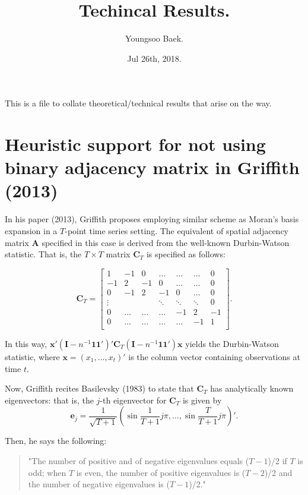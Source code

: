 \documentclass[12pt]{article}
\begin{document}
 
\title{Techincal Results.}
\author{Youngsoo Baek.}
\date{Jul 26th, 2018.}
\maketitle

This is a file to collate theoretical/technical results that arise on the way.

\section*{Heuristic support for not using binary adjacency matrix in Griffith (2013)}
In his paper (2013), Griffith proposes employing similar scheme as Moran's basis expansion in a $T$-point time series setting. The equivalent of spatial adjacency matrix $\mathbf{A}$ specified in this case is derived from the well-known Durbin-Watson statistic. That is, the $T\times T$ matrix $\mathbf{C}_T$ is specified as follows:

$$
\mathbf{C}_T = \left[
\begin{array}{ccccccc}
1 & -1 & 0 & \dots & \dots & \dots & 0\\
-1 & 2 & -1 & 0 & \dots & \dots & 0\\
0 & -1 & 2 & -1 & 0 & \dots & 0\\
\vdots & & & \ddots & \ddots & \ddots & 0\\
0 & \dots & \dots & \dots & -1 & 2 & -1\\
0 & \dots & \dots & \dots & \dots & -1 & 1\\
\end{array}
\right].
$$

In this way, $\mathbf{x}'(\mathbf{I}-n^{-1}\mathbf{1}\mathbf{1}')'\mathbf{C}_T(\mathbf{I}-n^{-1}\mathbf{1}\mathbf{1}')\mathbf{x}$ yields the Durbin-Watson statistic, where $\mathbf{x}=(x_1,\ldots,x_t)'$ is the column vector containing observations at time $t$.

Now, Griffith recites Basilevsky (1983) to state that $\mathbf{C}_T$ has analytically known eigenvectors: that is, the $j$-th eigenvector for $\mathbf{C}_T$ is given by
$$\mathbf{e}_j = \frac{1}{\sqrt{T+1}} (\sin\frac{1}{T+1}j\pi, \ldots, \sin\frac{T}{T+1}j\pi)'.$$

Then, he says the following: 
\begin{quote}
"The number of positive and of negative eigenvalues equals ($T-1$)/2 if $T$ is odd; when $T$ is even, the number of positive eigenvalues is ($T-2$)/2 and the number of negative eigenvalues is ($T-1$)/2." 
\end{quote}
\end{document}
